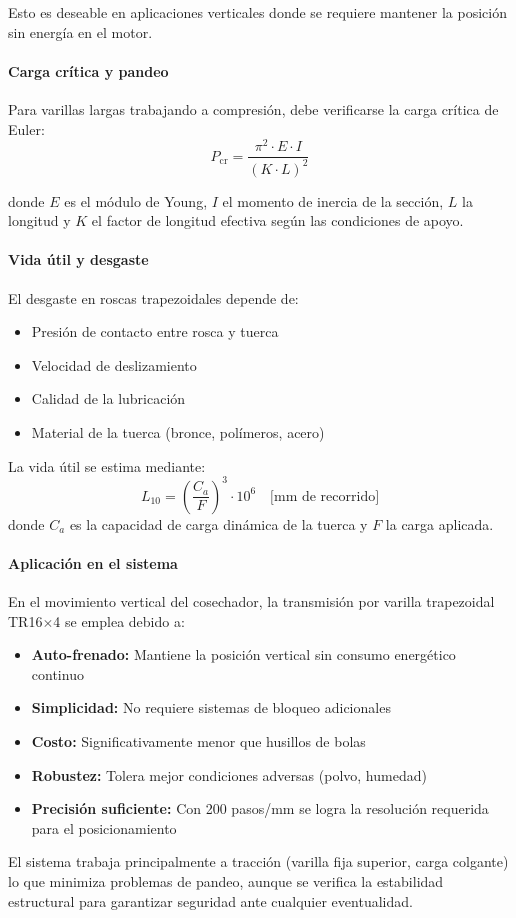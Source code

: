 Esto es deseable en aplicaciones verticales donde se requiere mantener la posición sin energía en el motor.

\paragraph{Carga crítica y pandeo}
Para varillas largas trabajando a compresión, debe verificarse la carga crítica de Euler:
\begin{equation}
    P_{\text{cr}} = \frac{\pi^2 \cdot E \cdot I}{(K \cdot L)^2}
\end{equation}

donde $E$ es el módulo de Young, $I$ el momento de inercia de la sección, $L$ la longitud y $K$ el factor de longitud efectiva según las condiciones de apoyo.

\paragraph{Vida útil y desgaste}
El desgaste en roscas trapezoidales depende de:
\begin{itemize}
    \item Presión de contacto entre rosca y tuerca
    \item Velocidad de deslizamiento
    \item Calidad de la lubricación
    \item Material de la tuerca (bronce, polímeros, acero)
\end{itemize}

La vida útil se estima mediante:
\begin{equation}
    L_{10} = \left(\frac{C_a}{F}\right)^3 \cdot 10^6 \quad \text{[mm de recorrido]}
\end{equation}
donde $C_a$ es la capacidad de carga dinámica de la tuerca y $F$ la carga aplicada.

\paragraph{Aplicación en el sistema}
En el movimiento vertical del cosechador, la transmisión por varilla trapezoidal TR16$\times$4 se emplea debido a:
\begin{itemize}
    \item \textbf{Auto-frenado:} Mantiene la posición vertical sin consumo energético continuo
    \item \textbf{Simplicidad:} No requiere sistemas de bloqueo adicionales
    \item \textbf{Costo:} Significativamente menor que husillos de bolas
    \item \textbf{Robustez:} Tolera mejor condiciones adversas (polvo, humedad)
    \item \textbf{Precisión suficiente:} Con 200 pasos/mm se logra la resolución requerida para el posicionamiento
\end{itemize}

El sistema trabaja principalmente a tracción (varilla fija superior, carga colgante) lo que minimiza problemas de pandeo, aunque se verifica la estabilidad estructural para garantizar seguridad ante cualquier eventualidad.
